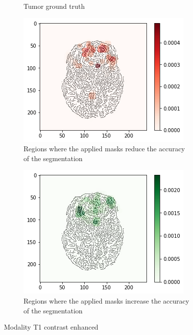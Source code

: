 \begin{figure}[H]
\begin{subfigure}[t]{.4\textwidth}
        \caption{Tumor ground truth}
    \end{subfigure}
    \begin{subfigure}[t]{.45\textwidth}
        \centering
        \includegraphics[width=\linewidth]{chapters/06_hdm/c_Brats18_2013_17_1_L1/48.png}
        \caption{Regions where the applied masks reduce the accuracy of the segmentation}
    \end{subfigure}\hspace{1cm}%
    \begin{subfigure}[t]{.45\textwidth}
        \centering
        \includegraphics[width=\linewidth]{chapters/06_hdm/c_Brats18_2013_17_1_L1/49.png}
        \caption{Regions where the applied masks increase the accuracy of the segmentation}
    \end{subfigure}
    \caption{Modality T1 contrast enhanced}
\end{figure}


